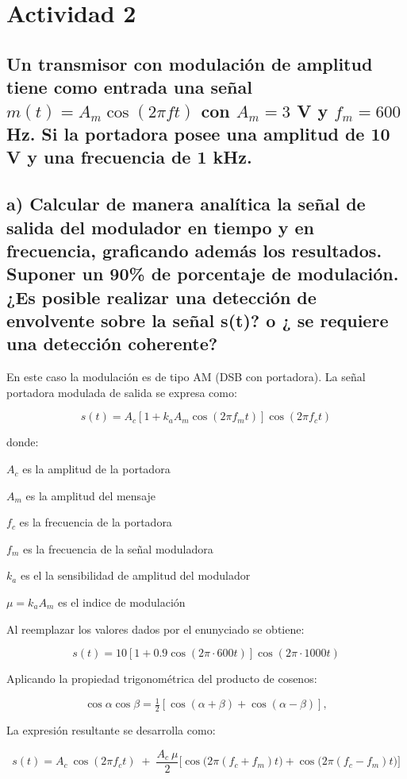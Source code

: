 \section{Actividad 2}

\subsection*{Un transmisor con modulación de amplitud tiene como entrada una señal $m(t)=A_m\cos(2\pi f t)$ con $A_m=3$ V y $f_m=600$ Hz. 
Si la portadora posee una amplitud de 10 V y una frecuencia de 1 kHz.}  

\subsection*{a)  Calcular de manera analítica la señal de salida del modulador en tiempo y en frecuencia, graficando además los resultados. Suponer un 90\% de porcentaje de modulación. ¿Es posible realizar una detección de envolvente sobre la señal s(t)? o ¿ se requiere una detección coherente?}

En este caso la modulación es de tipo AM (DSB con portadora). La señal portadora modulada de salida se expresa como:

    \[
        s(t) = A_c \left[ 1 + k_a A_m \cos(2\pi f_m t)\right]\cos(2\pi f_c t)
    \]

donde:  

\(A_c\) es la amplitud de la portadora 

\(A_m\) es la amplitud del mensaje

 \(f_c\) es la frecuencia de la portadora
 
 \(f_m\) es la frecuencia de la señal moduladora
 
 \(k_a\) es el la sensibilidad de amplitud del modulador

 \(\mu=k_a A_m\) es el indice de modulación

Al reemplazar los valores dados por el enunyciado se obtiene:

    \[
        s(t) = 10\left[1+0.9\cos(2\pi \cdot 600t)\right]\cos(2\pi \cdot 1000t)
    \]
    

Aplicando la propiedad trigonométrica del producto de cosenos:

    \[
        \cos\alpha \cos\beta = \tfrac{1}{2}\left[\cos(\alpha+\beta)+\cos(\alpha-\beta)\right],
    \]

La expresión resultante se desarrolla como:

    \[
        s(t) = A_c\ \cos(2\pi f_c t) \;+\; \frac{A_c \ \mu}{2}\Big[ \cos\big(2\pi(f_c+f_m)t\big) + \cos\big(2\pi(f_c-f_m)t\big) \Big]
    \]


